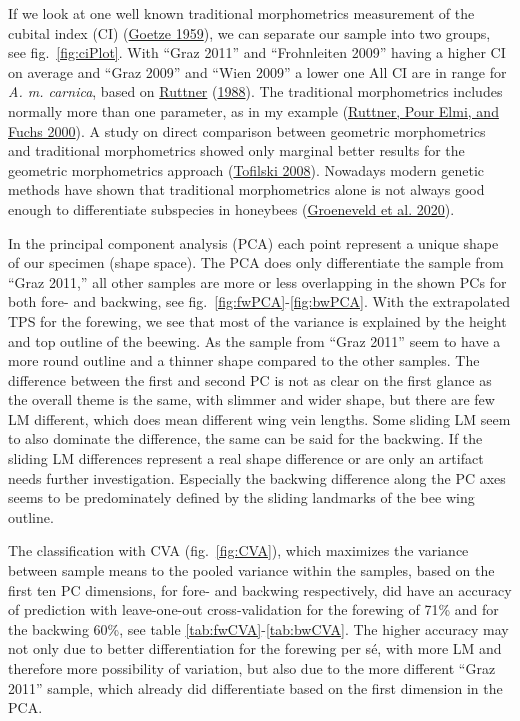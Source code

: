 \documentclass[
]{article}
\begin{document}
If we look at one well known traditional morphometrics measurement of the cubital index (CI) (\protect\hyperlink{ref-goetze1959}{Goetze 1959}), we can separate our sample into two groups, see fig.~\ref{fig:ciPlot}. With ``Graz 2011'' and ``Frohnleiten 2009'' having a higher CI on average and ``Graz 2009'' and ``Wien 2009'' a lower one All CI are in range for \emph{A. m. carnica}, based on \protect\hyperlink{ref-ruttner1988}{Ruttner} (\protect\hyperlink{ref-ruttner1988}{1988}). The traditional morphometrics includes normally more than one parameter, as in my example (\protect\hyperlink{ref-ruttner2000}{Ruttner, Pour Elmi, and Fuchs 2000}). A study on direct comparison between geometric morphometrics and traditional morphometrics showed only marginal better results for the geometric morphometrics approach (\protect\hyperlink{ref-tofilski2008}{Tofilski 2008}). Nowadays modern genetic methods have shown that traditional morphometrics alone is not always good enough to differentiate subspecies in honeybees (\protect\hyperlink{ref-groeneveld2020}{Groeneveld et al. 2020}).

In the principal component analysis (PCA) each point represent a unique shape of our specimen (shape space). The PCA does only differentiate the sample from ``Graz 2011,'' all other samples are more or less overlapping in the shown PCs for both fore- and backwing, see fig.~\ref{fig:fwPCA}-\ref{fig:bwPCA}. With the extrapolated TPS for the forewing, we see that most of the variance is explained by the height and top outline of the beewing. As the sample from ``Graz 2011'' seem to have a more round outline and a thinner shape compared to the other samples. The difference between the first and second PC is not as clear on the first glance as the overall theme is the same, with slimmer and wider shape, but there are few LM different, which does mean different wing vein lengths. Some sliding LM seem to also dominate the difference, the same can be said for the backwing. If the sliding LM differences represent a real shape difference or are only an artifact needs further investigation. Especially the backwing difference along the PC axes seems to be predominately defined by the sliding landmarks of the bee wing outline.

The classification with CVA (fig.~\ref{fig:CVA}), which maximizes the variance between sample means to the pooled variance within the samples, based on the first ten PC dimensions, for fore- and backwing respectively, did have an accuracy of prediction with leave-one-out cross-validation for the forewing of 71\% and for the backwing 60\%, see table \ref{tab:fwCVA}-\ref{tab:bwCVA}. The higher accuracy may not only due to better differentiation for the forewing per sé, with more LM and therefore more possibility of variation, but also due to the more different ``Graz 2011'' sample, which already did differentiate based on the first dimension in the PCA.
\end{document}
